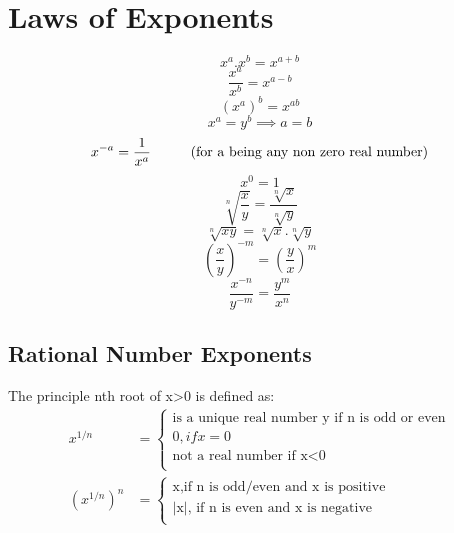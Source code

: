 \section{Laws of Exponents}
\begin{equation}
\label{xmn}
x^a . x^b  = x^{a+b}
\end{equation}
\begin{equation}
\label{xm/n}
\frac{x^a}{x^b}  = x^{a-b}
\end{equation}
\begin{equation}
\label{x^mn}
({x^a})^{b} = x^{ab}
\end{equation}
\begin{equation}
\label{xm_equal_xn}
x^a = y^b \implies a = b
\end{equation}
\begin{equation}
\label{xtominusn}
x^{-a} = \frac{1}{x^a} \hspace{10mm} 
\text{(for a being any non zero real number)}
\end{equation}
\begin{equation}
\label{xto0}
x^{0} = 1
\end{equation}
\begin{equation}
\label{nrootxy}
\sqrt[n]{\frac{x}{y}} = \frac{\sqrt[n]{x}}{\sqrt[n]{y}}
\end{equation}
\begin{equation}
\label{nxy}
\sqrt[n]{xy} = \sqrt[n]{x}.\sqrt[n]{y}
\end{equation}
\begin{equation}
\label{xy-m}
\left( \frac{x}{y} \right)^{-m} = \left( \frac{y}{x} \right)^{m}
\end{equation}
\begin{equation}
\label{xynm}
\frac{x^{-n}}{y^{-m}} = \frac{y^m}{x^n}
\end{equation}

\subsection{Rational Number Exponents}
The principle nth root of x>0 is defined as: \\
\begin{align*}
x^{1/n} &= 
\begin{cases}
\text{is a unique real number y if n is odd or even} \\
0, if x = 0 \\
\text{not a real number if x<0}\\
\end{cases}
\\
(x^{1/n})^{n} &= 
\begin{cases}
\text{x,if n is odd/even and x is positive} \\
\text{|x|, if n is even and x is negative}\\
\end{cases}
\end{align*}




